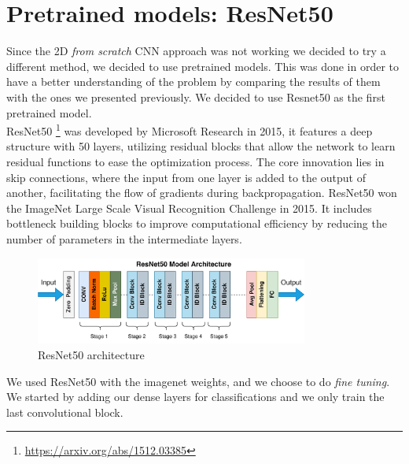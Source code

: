 \begin{table}[]
    \centering
    \caption{2D models accuracy and recall}
    \label{tab:2DCNNTable}
\end{table}
\pagebreak
\section{Pretrained models: ResNet50}
Since the 2D \textit{from scratch} CNN approach was not working we decided to try a different method, we decided to use pretrained models. This was done in order to have a better understanding of the problem by comparing the results of them with the ones we presented previously. We decided to use Resnet50 as the first pretrained model. \\

ResNet50 \footnote{\url{https://arxiv.org/abs/1512.03385}} was developed by Microsoft Research in 2015, it features a deep structure with 50 layers, utilizing residual blocks that allow the network to learn residual functions to ease the optimization process.
The core innovation lies in skip connections, where the input from one layer is added to the output of another, facilitating the flow of gradients during backpropagation.
ResNet50  won the ImageNet Large Scale Visual Recognition Challenge in 2015. It includes bottleneck building blocks to improve computational efficiency by reducing the number of parameters in the intermediate layers.
\begin{figure}[]
    \centering
    \includegraphics[width=0.8\textwidth]{images/ResNet50_architecture.png}
    \caption{ResNet50 architecture}
    \label{fig:ResNet50Arch}
\end{figure}
We used ResNet50 with the imagenet weights, and we choose to do 
\textit{fine tuning}. We started by adding our dense layers for classifications and we only train the last convolutional block.  

